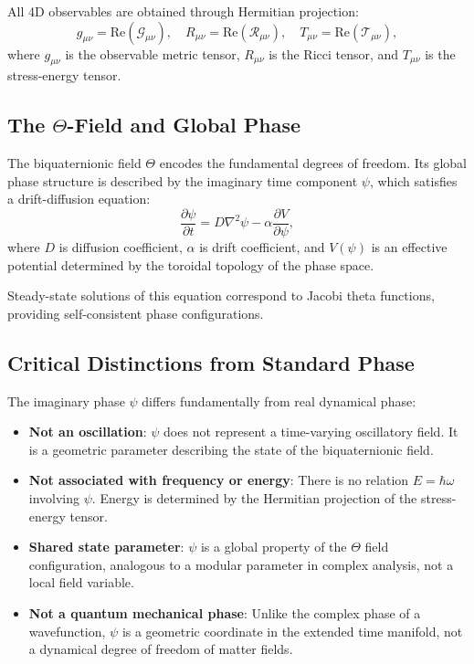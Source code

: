 \documentclass[12pt]{article}
\begin{document}
All 4D observables are obtained through Hermitian projection:
\begin{equation}
g_{\mu\nu} = \text{Re}(\mathcal{G}_{\mu\nu}), \quad R_{\mu\nu} = \text{Re}(\mathcal{R}_{\mu\nu}), \quad T_{\mu\nu} = \text{Re}(\mathcal{T}_{\mu\nu}),
\label{eq:hermitian_projection}
\end{equation}
where $g_{\mu\nu}$ is the observable metric tensor, $R_{\mu\nu}$ is the Ricci tensor, and $T_{\mu\nu}$ is the stress-energy tensor.

\subsection{The $\Theta$-Field and Global Phase}

The biquaternionic field $\Theta$ encodes the fundamental degrees of freedom. Its global phase structure is described by the imaginary time component $\psi$, which satisfies a drift-diffusion equation:
\begin{equation}
\frac{\partial \psi}{\partial t} = D \nabla^2 \psi - \alpha \frac{\partial V}{\partial \psi},
\label{eq:psi_dynamics}
\end{equation}
where $D$ is diffusion coefficient, $\alpha$ is drift coefficient, and $V(\psi)$ is an effective potential determined by the toroidal topology of the phase space.

Steady-state solutions of this equation correspond to Jacobi theta functions, providing self-consistent phase configurations.

\subsection{Critical Distinctions from Standard Phase}

The imaginary phase $\psi$ differs fundamentally from real dynamical phase:
\begin{itemize}
\item \textbf{Not an oscillation}: $\psi$ does not represent a time-varying oscillatory field. It is a geometric parameter describing the state of the biquaternionic field.
\item \textbf{Not associated with frequency or energy}: There is no relation $E = \hbar\omega$ involving $\psi$. Energy is determined by the Hermitian projection of the stress-energy tensor.
\item \textbf{Shared state parameter}: $\psi$ is a global property of the $\Theta$ field configuration, analogous to a modular parameter in complex analysis, not a local field variable.
\item \textbf{Not a quantum mechanical phase}: Unlike the complex phase of a wavefunction, $\psi$ is a geometric coordinate in the extended time manifold, not a dynamical degree of freedom of matter fields.
\end{itemize}
\end{document}

